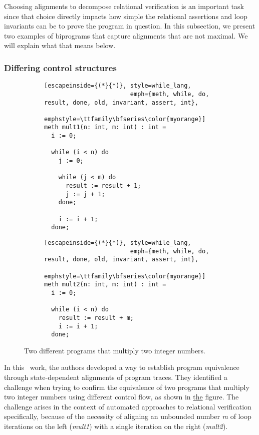 Choosing alignments to decompose relational verification is an important task since that choice directly impacts how simple the relational assertions and loop invariants can be to prove the program in question.
In this subsection, we present two examples of biprograms that capture alignments that are not maximal.
We will explain what that means below.


\subsubsection{Differing control structures}
\label{subsubsec:diff_control_structs}

\begin{figure}[h]
  \centering

  \begin{subfigure}[t]{0.49\textwidth}
    \centering
    \noindent
    \begin{lstlisting}[escapeinside={(*}{*)}, style=while_lang,
                        emph={meth, while, do, result, done, old, invariant, assert, int},
                        emphstyle=\ttfamily\bfseries\color{myorange}]
meth mult1(n: int, m: int) : int =
  i := 0;

  while (i < n) do
    j := 0;

    while (j < m) do
      result := result + 1;
      j := j + 1;
    done;

    i := i + 1;
  done;
    \end{lstlisting}
  \end{subfigure}
  \hfill
  \begin{subfigure}[t]{0.49\textwidth}
    \centering
    \noindent
    \begin{lstlisting}[escapeinside={(*}{*)}, style=while_lang,
                        emph={meth, while, do, result, done, old, invariant, assert, int},
                        emphstyle=\ttfamily\bfseries\color{myorange}]
meth mult2(n: int, m: int) : int =
  i := 0;

  while (i < n) do
    result := result + m;
    i := i + 1;
  done;
    \end{lstlisting}
  \end{subfigure}

  \caption{Two different programs that multiply two integer numbers.}
  \label{fig:mult_source_programs}
\end{figure}

In this~\cite{DBLP:conf/pldi/ChurchillP0A19} work, the authors developed a way to establish program equivalence through state-dependent alignments of program traces.
They identified a challenge when trying to confirm the equivalence of two programs that multiply two integer numbers using different control flow, as shown in \hyperref[fig:mult_source_programs]{the} figure.
The challenge arises in the context of automated approaches to relational verification specifically, because of the necessity of aligning an unbounded number \emph{m} of loop iterations on the left (\emph{mult1}) with a single iteration on the right (\emph{mult2}).

